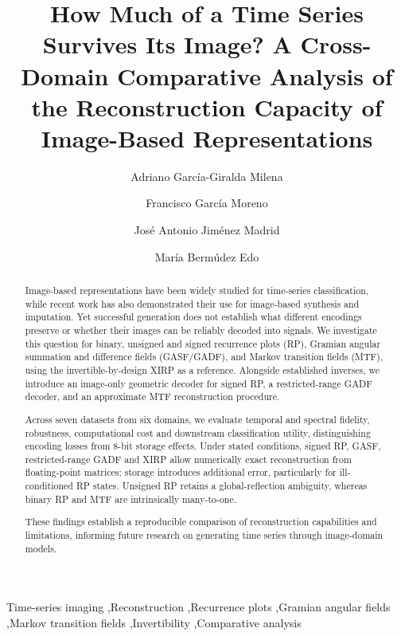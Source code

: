 \documentclass[preprint,review,12pt]{elsarticle}
\begin{document}
\begin{frontmatter}

\title{How Much of a Time Series Survives Its Image? A Cross-Domain Comparative Analysis of the Reconstruction Capacity of Image-Based Representations}

\author[mydass]{Adriano García-Giralda Milena}
\author[cls]{Francisco García Moreno}
\author[alg]{José Antonio Jiménez Madrid}
\author[cls]{María Bermúdez Edo}


\begin{abstract}
Image-based representations have been widely studied for time-series classification, while recent work has also demonstrated their use for image-based synthesis and imputation. Yet successful generation does not establish what different encodings preserve or whether their images can be reliably decoded into signals. We investigate this question for binary, unsigned and signed recurrence plots (RP), Gramian angular summation and difference fields (GASF/GADF), and Markov transition fields (MTF), using the invertible-by-design XIRP as a reference. Alongside established inverses, we introduce an image-only geometric decoder for signed RP, a restricted-range GADF decoder, and an approximate MTF reconstruction procedure.

Across seven datasets from six domains, we evaluate temporal and spectral fidelity, robustness, computational cost and downstream classification utility, distinguishing encoding losses from 8-bit storage effects. Under stated conditions, signed RP, GASF, restricted-range GADF and XIRP allow numerically exact reconstruction from floating-point matrices; storage introduces additional error, particularly for ill-conditioned RP states. Unsigned RP retains a global-reflection ambiguity, whereas binary RP and MTF are intrinsically many-to-one.

These findings establish a reproducible comparison of reconstruction capabilities and limitations, informing future research on generating time series through image-domain models.
\end{abstract}

\begin{keyword}
Time-series imaging \sep Reconstruction \sep Recurrence plots \sep Gramian angular fields \sep Markov transition fields \sep Invertibility \sep Comparative analysis
\end{keyword}

\end{frontmatter}
\end{document}
